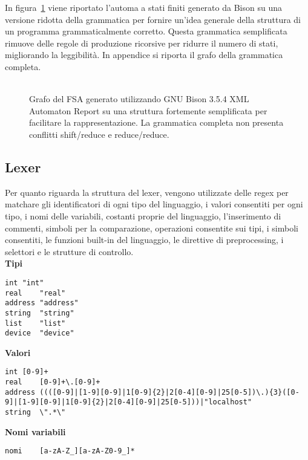 \documentclass[10pt]{article}
\begin{document}
In figura~\ref{fig:parser_simple} viene riportato l'automa a stati finiti generato da Bison su una versione ridotta della grammatica per fornire un'idea generale della struttura di un programma grammaticalmente corretto. Questa grammatica semplificata rimuove delle regole di produzione ricorsive per ridurre il numero di stati, migliorando la leggibilità. In appendice si riporta il grafo della grammatica completa.\\\\


\begin{figure}[b]
	\centering
	\caption{Grafo del FSA generato utilizzando  GNU Bison 3.5.4 XML Automaton Report su una struttura fortemente semplificata per facilitare la rappresentazione. La grammatica completa non presenta conflitti shift/reduce e reduce/reduce.}
	\label{fig:parser_simple}
\end{figure}

\subsection{Lexer}

Per quanto riguarda la struttura del lexer, vengono utilizzate delle regex per matchare gli identificatori di ogni tipo del linguaggio, i valori consentiti per ogni tipo, i nomi delle variabili, costanti proprie del linguaggio, l'inserimento di commenti, simboli per la comparazione, operazioni consentite sui tipi, i simboli consentiti, le funzioni built-in del linguaggio, le direttive di preprocessing, i selettori e le strutture di controllo.\\

\textbf{Tipi}
\begin{lstlisting}[breaklines=true, postbreak=\mbox{{$\hookrightarrow$}\space}]
int	"int"
real	"real"
address	"address"
string	"string"
list	"list"
device	"device"
\end{lstlisting}

\textbf{Valori}
\begin{lstlisting}[breaklines=true, postbreak=\mbox{{$\hookrightarrow$}\space}]
int	[0-9]+
real	[0-9]+\.[0-9]+
address	((([0-9]|[1-9][0-9]|1[0-9]{2}|2[0-4][0-9]|25[0-5])\.){3}([0-9]|[1-9][0-9]|1[0-9]{2}|2[0-4][0-9]|25[0-5]))|"localhost"
string	\".*\"
\end{lstlisting}

\textbf{Nomi variabili}
\begin{lstlisting}[breaklines=true, postbreak=\mbox{{$\hookrightarrow$}\space}]
nomi	[a-zA-Z_][a-zA-Z0-9_]*
\end{lstlisting}
\end{document}

